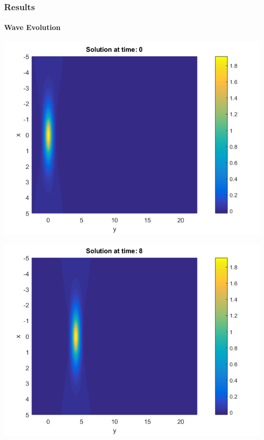 \documentclass{beamer}
\begin{document}

\begin{frame}
\frametitle{Results}
\framesubtitle{Wave Evolution}
\begin{center}\vspace{0.4cm}
	\begin{minipage}[b]{0.30\linewidth}
		\includegraphics[width=\linewidth]{figures/Solution_bt3_t=0.png}
	\end{minipage}	
	\begin{minipage}[b]{0.30\linewidth}
		\includegraphics[width=\linewidth]{figures/Solution_bt3_t=8.png}
	\end{minipage}	
	\begin{minipage}[b]{0.30\linewidth}

\end{minipage}
\end{center}
\end{frame}
\end{document}

